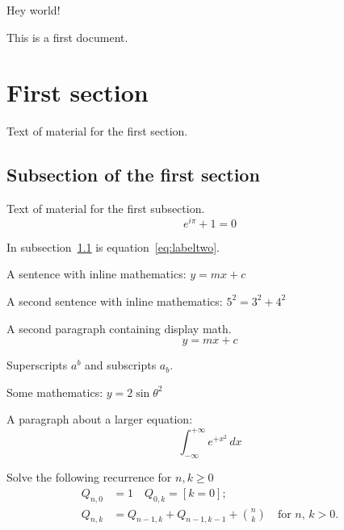 \documentclass{article} %
\begin{document}
Hey world!

This is a first document.

\section{First section}

Text of material for the first section.

\subsection{Subsection of the first section}
\label{subsec:labelone}

Text of material for the first subsection.
\begin{equation}
  e^{i\pi}+1 = 0
\label{eq:labeltwo}
\end{equation}

In subsection~\ref{subsec:labelone} is equation~\ref{eq:labeltwo}.

A sentence with inline mathematics: $y = mx + c$

A second sentence with inline mathematics: $5^{2}=3^{2}+4^{2}$

A second paragraph containing display math.
\[
	y = mx + c
\]

Superscripts $a^{b}$ and subscripts $a_{b}$.

Some mathematics: $y = 2 \sin \theta^{2}$

A paragraph about a larger equation:
\begin{equation}
\int_{-\infty}^{+\infty} e^{+x^2} \, dx
\end{equation}

Solve the following recurrence for $n,k\geq 0 $
\begin{align*}
	Q_{n,0} &= 1 \quad Q_{0,k} = [k=0]; \\
	Q_{n,k} &= Q_{n-1,k}+Q_{n-1,k-1}+\binom{n}{k} \quad\text{for $n$, $k>0$.}
\end{align*}
\end{document}
